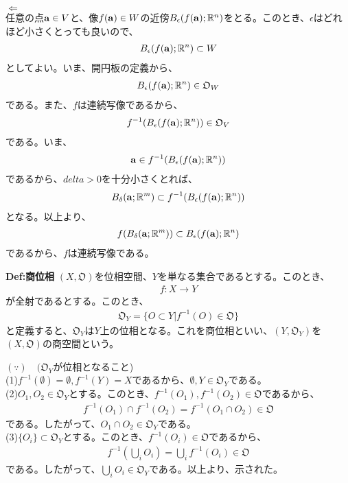 \documentclass[a4paper,11pt]{jsarticle}
\numberwithin{equation}{section}
\begin{document}
\textbf{$\Leftarrow$}\\
任意の点$\vb{a} \in V$と、像$f(\vb{a}) \in W$の近傍$B_{\epsilon}(f(\vb{a});\mathbb{R}^n)$をとる。このとき、$\epsilon$はどれほど小さくとっても良いので、
\begin{align}
  B_{\epsilon}(f(\vb{a});\mathbb{R}^n) \subset W
\end{align}
としてよい。いま、開円板の定義から、
\begin{align}
  B_{\epsilon}(f(\vb{a});\mathbb{R}^n) \in \mathfrak{O}_W
\end{align}
である。また、$f$は連続写像であるから、
\begin{align}
  f^{-1}(B_{\epsilon}(f(\vb{a});\mathbb{R}^n)) \in \mathfrak{O}_V
\end{align}
である。いま、
\begin{align}
  \vb{a} \in f^{-1}(B_{\epsilon}(f(\vb{a});\mathbb{R}^n))
\end{align}
であるから、$delta >0$を十分小さくとれば、
\begin{align}
  B_{\delta}(\vb{a};\mathbb{R}^m) \subset f^{-1}(B_{\epsilon}(f(\vb{a});\mathbb{R}^n))
\end{align}
となる。以上より、
\begin{align}
  f(B_{\delta}(\vb{a};\mathbb{R}^m)) \subset B_{\epsilon}(f(\vb{a});\mathbb{R}^n)
\end{align}
であるから、$f$は連続写像である。\hfill\qedsymbol\\

\begin{itembox}[l]{\textbf{Def:商位相}}
  $(X,\mathfrak{O})$を位相空間、$Y$を単なる集合であるとする。このとき、
  \begin{align}
    f:X \to Y
  \end{align}
  が全射であるとする。このとき、
  \begin{align}
    \mathfrak{O}_Y = \{O \subset Y | f^{-1}(O) \in \mathfrak{O}\}
  \end{align}
  と定義すると、$\mathfrak{O}_Y$は$Y$上の位相となる。これを商位相といい、$(Y,\mathfrak{O}_Y)$を$(X,\mathfrak{O})$の商空間という。
\end{itembox}
$(\because) \quad (\mathfrak{O}_Y$が位相となること)\\
(1)$f^{-1}(\emptyset) = \emptyset, f^{-1}(Y) = X$であるから、$\emptyset, Y \in \mathfrak{O}_Y$である。\\
(2)$O_1,O_2 \in \mathfrak{O}_Y$とする。このとき、$f^{-1}(O_1),f^{-1}(O_2) \in \mathfrak{O}$であるから、
\begin{align}
  f^{-1}(O_1) \cap f^{-1}(O_2) = f^{-1}(O_1 \cap O_2) \in \mathfrak{O}
\end{align}
である。したがって、$O_1 \cap O_2 \in \mathfrak{O}_Y$である。\\
(3)$\{O_i\} \subset \mathfrak{O}_Y$とする。このとき、$f^{-1}(O_i) \in \mathfrak{O}$であるから、
\begin{align}
  f^{-1}\left(\bigcup_{i} O_i\right) = \bigcup_{i} f^{-1}(O_i) \in \mathfrak{O}
\end{align}
である。したがって、$\bigcup_{i} O_i \in \mathfrak{O}_Y$である。以上より、示された。\hfill\qedsymbol\\
\end{document}
